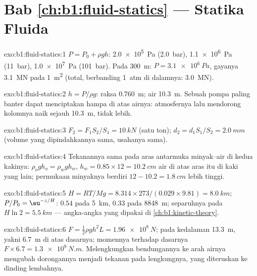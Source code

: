 \section*{Bab \ref{ch:b1:fluid-statics} --- Statika Fluida}

\begin{solution}{exo:b1:fluid-statics:1}
$P = P_0 + \rho gh$: \qty{2.0e5}{Pa} (\qty{2.0}{bar}), \qty{1.1e6}{Pa}
(\qty{11}{bar}), \qty{1.0e7}{Pa} (\qty{101}{bar}). Pada \qty{300}{m}: $P =
\qty{3.1e6}{Pa}$, gayanya \qty{3.1}{MN} pada \qty{1}{m^2} (total, berbanding
\qty{1}{atm} di dalamnya: \qty{3.0}{MN}).
\end{solution}

\begin{solution}{exo:b1:fluid-statics:2}
$h = P/\rho g$: raksa \qty{0.760}{m}; air \qty{10.3}{m}. Sebuah pompa paling
banter dapat menciptakan hampa di atas airnya: atmosfernya lalu mendorong
kolomnya naik sejauh \qty{10.3}{m}, tidak lebih.
\end{solution}

\begin{solution}{exo:b1:fluid-statics:3}
$F_2 = F_1S_2/S_1 = \qty{10}{kN}$ (satu ton); $d_2 = d_1S_1/S_2 = \qty{2.0}{mm}$
(volume yang dipindahkannya sama, usahanya sama).
\end{solution}

\begin{solution}{exo:b1:fluid-statics:4}
Tekanannya sama pada aras antarmuka minyak--air di kedua kakinya: $\rho_og
h_o = \rho_wgh_w$, $h_w = 0.85 \times 12 = \qty{10.2}{cm}$ air di atas
aras itu di kaki yang lain; permukaan minyaknya berdiri $12 - 10.2 = \qty{1.8}{cm}$
lebih tinggi.
\end{solution}

\begin{solution}{exo:b1:fluid-statics:5}
$H = RT/Mg = 8.314 \times 273/(0.029 \times 9.81) = \qty{8.0}{km}$; $P/P_0 =
\eu^{-z/H}$: $0.54$ pada \qty{5}{km}, $0.33$ pada \qty{8848}{m}; separuhnya pada $H\ln2 =
\qty{5.5}{km}$ --- angka-angka yang dipakai di \cref{ch:b1:kinetic-theory}.
\end{solution}

\begin{solution}{exo:b1:fluid-statics:6}
$F = \tfrac12\rho gh^2L = \qty{1.96e8}{N}$;  pada kedalaman
\qty{13.3}{m}, yakni \qty{6.7}{m} di atas dasarnya; momennya terhadap dasarnya $F \times
6.7 = \qty{1.3e9}{N.m}$. Melengkungkan bendungannya ke arah airnya mengubah dorongannya
menjadi tekanan pada lengkungnya, yang diteruskan ke dinding lembahnya.
\end{solution}

